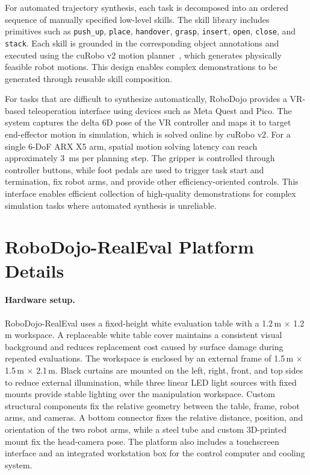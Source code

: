 For automated trajectory synthesis, each task is decomposed into an ordered sequence of manually specified low-level skills. The skill library includes primitives such as \texttt{push\_up}, \texttt{place}, \texttt{handover}, \texttt{grasp}, \texttt{insert}, \texttt{open}, \texttt{close}, and \texttt{stack}. Each skill is grounded in the corresponding object annotations and executed using the cuRobo v2 motion planner~\citep{sundaralingam2026curobov2dynamicsawaremotiongeneration}, which generates physically feasible robot motions. This design enables complex demonstrations to be generated through reusable skill composition.

For tasks that are difficult to synthesize automatically, RoboDojo provides a VR-based teleoperation interface using devices such as Meta Quest and Pico. The system captures the delta 6D pose of the VR controller and maps it to target end-effector motion in simulation, which is solved online by cuRobo v2. For a single 6-DoF ARX X5 arm, spatial motion solving latency can reach approximately 3~ms per planning step. The gripper is controlled through controller buttons, while foot pedals are used to trigger task start and termination, fix robot arms, and provide other efficiency-oriented controls. This interface enables efficient collection of high-quality demonstrations for complex simulation tasks where automated synthesis is unreliable.


\section{RoboDojo-RealEval Platform Details}
\label{appendix:realeval_details}

\paragraph{Hardware setup.}
RoboDojo-RealEval uses a fixed-height white evaluation table with a 1.2\,m $\times$ 1.2\,m workspace. A replaceable white table cover maintains a consistent visual background and reduces replacement cost caused by surface damage during repeated evaluations. The workspace is enclosed by an external frame of 1.5\,m $\times$ 1.5\,m $\times$ 2.1\,m. Black curtains are mounted on the left, right, front, and top sides to reduce external illumination, while three linear LED light sources with fixed mounts provide stable lighting over the manipulation workspace. Custom structural components fix the relative geometry between the table, frame, robot arms, and cameras. A bottom connector fixes the relative distance, position, and orientation of the two robot arms, while a steel tube and custom 3D-printed mount fix the head-camera pose. The platform also includes a touchscreen interface and an integrated workstation box for the control computer and cooling system.

